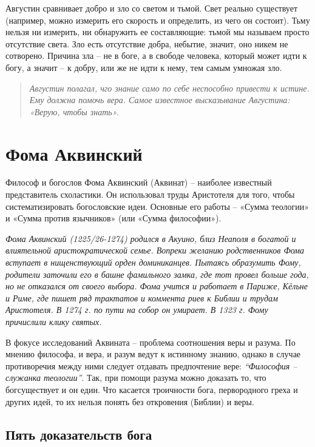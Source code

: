 \documentclass[a4paper, 14pt]{extreport}
\begin{document}
Августин сравнивает добро и зло со светом и тьмой. Свет реально
существует (например, можно измерить его скорость и определить, из чего
он состоит). Тьму нельзя ни измерить, ни обнаружить ее составляющие:
тьмой мы называем просто отсутствие света. Зло есть отсутствие добра,
небытие, значит, оно никем не сотворено. Причина зла -- не в боге, а в
свободе человека, который может идти к богу, а значит -- к добру, или же
не идти к нему, тем самым умножая зло.

\begin{quote}
\emph{Августин полагал, чго знание само по себе неспособно привести к
истине. Ему должна помочь вера. Самое известное высказывание Августина:
«Верую, чтобы знать».}
\end{quote}

\section{Фома Аквинский}

Философ и богослов Фома Аквинский (Аквинат) -- наиболее известный
представитель схоластики. Он использовал труды Аристотеля для того,
чтобы систематизировать богословские идеи. Основные его работы -- «Сумма
теологии» и «Сумма против язычников» (или «Сумма философии»).

\emph{Фома Аквинский (1225/26-1274) родился в Акуино, близ Неаполя в
богатой и влиятельной аристократической семье. Вопреки желанию
родственников Фома вступает в нищенствующий орден доминиканцев. Пытаясь
образумить Фому, родители заточили его в башне фамильного замка, где тот
провел больше года, но не отказался от своего выбора. Фома учится и
работает в Париже, Кёльне и Риме, где пишет ряд трактатов и коммента­
риев к Библии и трудам Аристотеля. В 1274 г. по пути на собор он
умирает. В 1323 г. Фому причислили клику святых.}

В фокусе исследований Аквината -- проблема соотношения веры и разума. По
мнению философа, и вера, и разум ведут к истинному знанию, однако в
случае противоречия между ними следует отдавать предпочтение вере:
\emph{``Философия -- служанка теологии''}. Так, при помощи разума можно
доказать то, что богсуществует и он един. Что касается троичности бога,
первородного греха и других идей, то их нельзя понять без откровения
(Библии) и веры.

\subsection{Пять доказательств бога}
\end{document}
